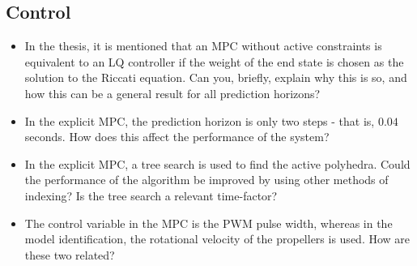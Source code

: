 \subsection{Control}
\begin{itemize}
	\item In the thesis, it is mentioned that an MPC without active constraints is
			equivalent to an LQ controller if the weight of the end state is chosen
			as the solution to the Riccati equation. Can you, briefly, explain why this is
			so, and how this can be a general result for all prediction horizons?
			
	\item In the explicit MPC, the prediction horizon is only two steps - that is, $0.04$ seconds.
			How does this affect the performance of the system?
			
	\item In the explicit MPC, a tree search is used to find the active polyhedra. 
			Could the performance of the algorithm be improved by using other methods
			of indexing? Is the tree search a relevant time-factor?
			
	\item The control variable in the MPC is the PWM pulse width, whereas in the
			model identification, the rotational velocity of
			the propellers is used. How are these two related?
\end{itemize}
